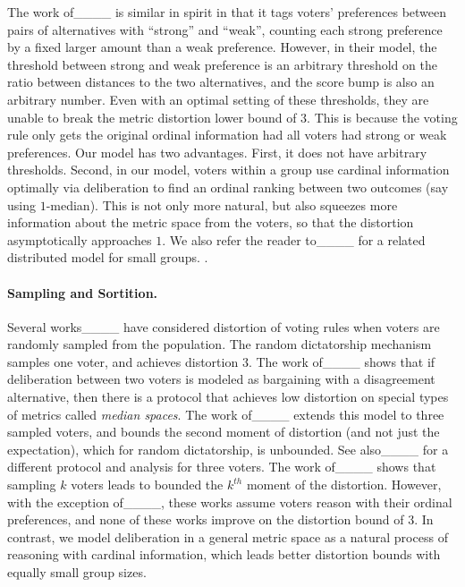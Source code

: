 The work of____ is similar in spirit in that it tags voters' preferences between pairs of alternatives with ``strong'' and ``weak'', counting each strong preference by a fixed larger amount than a weak preference.  However, in their model, the threshold between strong and weak preference is an arbitrary threshold on the ratio between distances to the two alternatives, and the score bump is also an arbitrary number. Even with an optimal setting of these thresholds, they are unable to break the metric distortion lower bound of $3$. This is because the voting rule only gets the original ordinal information had all voters had strong or weak preferences.  Our model has two advantages. First, it does not have arbitrary thresholds. Second, in our model, voters within a group use cardinal information optimally via deliberation  to find an ordinal ranking between two outcomes (say using $1$-median). This is not only more natural, but also squeezes more information about the metric space from the voters, so that the distortion asymptotically approaches $1$.  We also refer the reader to____ for a related distributed model for small groups. . %

\paragraph{Sampling and Sortition.} Several works____ have considered distortion of voting rules when voters are randomly sampled from the population. The random dictatorship mechanism samples one voter, and achieves distortion $3$. The work of____ shows that if deliberation between two voters is modeled as bargaining with a disagreement alternative, then there is a protocol that achieves low distortion on special types of metrics called {\em median spaces}. The work of____ extends this model to three sampled voters, and bounds the second moment of distortion (and not just the expectation), which for random dictatorship, is unbounded. See also____ for a different protocol and analysis for three voters. The work of____ shows that sampling $k$ voters leads to bounded the $k^{th}$ moment of the distortion. However, with the exception of____, these works assume voters reason with their ordinal preferences, and none of these works improve on the distortion bound of $3$. In contrast, we model deliberation in a general metric space as a natural process of reasoning with cardinal information, which leads better distortion bounds with equally small group sizes.

